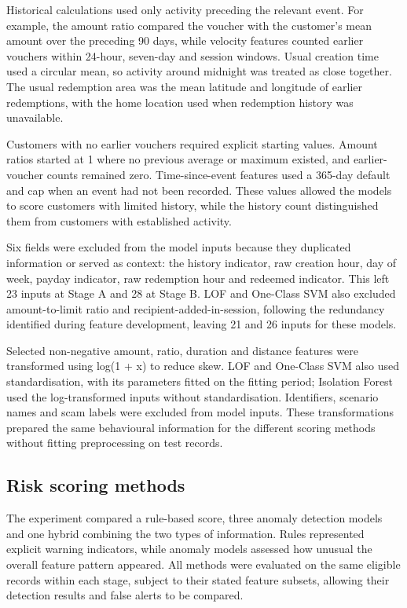 \documentclass[11pt,a4paper]{article}
\begin{document}
Historical calculations used only activity preceding the relevant event. For example, the amount ratio compared the voucher with the customer's mean amount over the preceding 90 days, while velocity features counted earlier vouchers within 24-hour, seven-day and session windows. Usual creation time used a circular mean, so activity around midnight was treated as close together. The usual redemption area was the mean latitude and longitude of earlier redemptions, with the home location used when redemption history was unavailable.

Customers with no earlier vouchers required explicit starting values. Amount ratios started at 1 where no previous average or maximum existed, and earlier-voucher counts remained zero. Time-since-event features used a 365-day default and cap when an event had not been recorded. These values allowed the models to score customers with limited history, while the history count distinguished them from customers with established activity.

Six fields were excluded from the model inputs because they duplicated information or served as context: the history indicator, raw creation hour, day of week, payday indicator, raw redemption hour and redeemed indicator. This left 23 inputs at Stage A and 28 at Stage B. LOF and One-Class SVM also excluded amount-to-limit ratio and recipient-added-in-session, following the redundancy identified during feature development, leaving 21 and 26 inputs for these models.

Selected non-negative amount, ratio, duration and distance features were transformed using log(1 + x) to reduce skew. LOF and One-Class SVM also used standardisation, with its parameters fitted on the fitting period; Isolation Forest used the log-transformed inputs without standardisation. Identifiers, scenario names and scam labels were excluded from model inputs. These transformations prepared the same behavioural information for the different scoring methods without fitting preprocessing on test records.

\subsection{Risk scoring methods}

The experiment compared a rule-based score, three anomaly detection models and one hybrid combining the two types of information. Rules represented explicit warning indicators, while anomaly models assessed how unusual the overall feature pattern appeared. All methods were evaluated on the same eligible records within each stage, subject to their stated feature subsets, allowing their detection results and false alerts to be compared.
\end{document}
